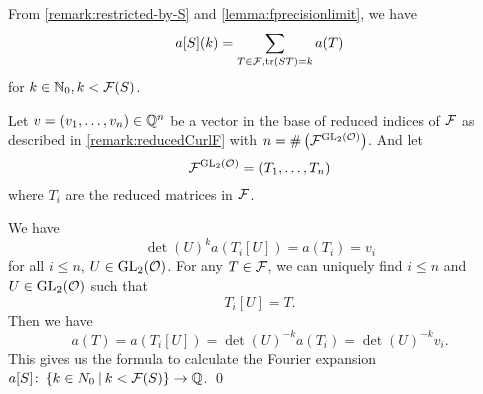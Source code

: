 \begin{remark}
From \cref{remark:restricted-by-S} and \cref{lemma:fprecisionlimit}, we have
\[ a[S] (k) = \sum_{T \in \mathcal{F}, \textup{\textrm{tr}}(S T) = k} a(T) \]
for $k \in \mathbb{N}_0, k < \mathcal{F}(S)$.

Let $v = (v_1, \dots, v_n) \in \mathbb{Q}^n$ be a vector in the base of reduced indices of $\mathcal{F}$ as described in \cref{remark:reducedCurlF} with $n = \# \left( {\mathcal{F}}^{\operatorname{GL}_2(\mathcal{O})} \right)$. And let
\[ {\mathcal{F}}^{\operatorname{GL}_2(\mathcal{O})} = (T_1, \dots, T_n) \]
where $T_i$ are the reduced matrices in $\mathcal{F}$.

We have
\[ \det(U)^k a(T_i[U]) = a(T_i) = v_i \]
for all $i \le n$, $U \in \operatorname{GL}_2(\mathcal{O})$.
For any $T \in \mathcal{F}$, we can uniquely find $i \le n$ and $U \in \operatorname{GL}_2(\mathcal{O})$ such that
\[ T_i[U] = T. \]
Then we have
\[ a(T) = a(T_i[U]) = \det(U)^{-k} a(T_i) = \det(U)^{-k} v_i . \]
This gives us the formula to calculate the Fourier expansion $a[S] \colon \Set{k \in N_0}{k < \FPrecisionLimit{S}} \rightarrow \Q$.
\qed
\end{remark}


